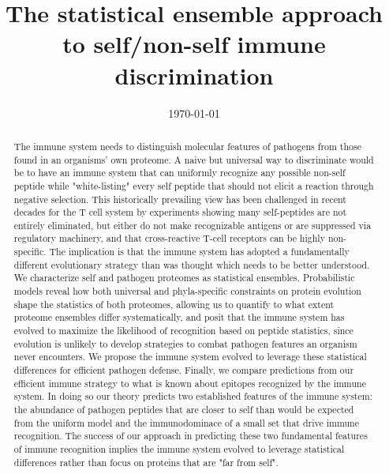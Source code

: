 \documentclass[superscriptaddress,twocolumn,pre]{revtex4}
\newcommand{\<}{\langle}
\renewcommand{\>}{\rangle}
\begin{document}
\title{The statistical ensemble approach to self/non-self immune discrimination}
\date{\today}

\begin{abstract}
The immune system needs to distinguish molecular features of pathogens from those found in an organisms' own proteome. A naive but universal way to discriminate would be to have an immune system that can uniformly recognize any possible non-self peptide while "white-listing" every self peptide that should not elicit a reaction through negative selection. This historically prevailing view has been challenged in recent decades for the T cell system by experiments showing many self-peptides are not entirely eliminated, but either do not make recognizable antigens or are suppressed via regulatory machinery, and that cross-reactive T-cell receptors can be highly non-specific. The implication is that the immune system has adopted a fundamentally different evolutionary strategy than was thought which needs to be better understood. We characterize self and pathogen proteomes as statistical ensembles. Probabilistic models reveal how both universal and phyla-specific constraints on protein evolution shape the statistics of both proteomes, allowing us to quantify to what extent proteome ensembles differ systematically, and posit that the immune system has evolved to maximize the likelihood of recognition based on peptide statistics, since evolution is unlikely to develop strategies to combat pathogen features an organism never encounters. We propose the immune system evolved to leverage these statistical differences for efficient pathogen defense. Finally, we compare predictions from our efficient immune strategy to what is known about epitopes recognized by the immune system. In doing so our theory predicts two established features of the immune system: the abundance of pathogen peptides that are closer to self than would be expected from the uniform model and the immunodominace of a small set that drive immune recognition. The success of our approach in predicting these two fundamental features of immune recognition implies the immune system evolved to leverage statistical differences rather than focus on proteins that are "far from self". 
\end{abstract}

\maketitle
\end{document}
